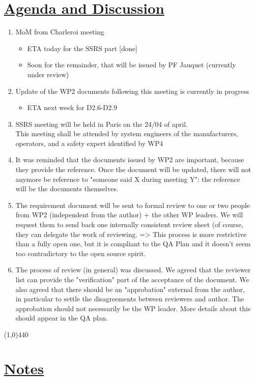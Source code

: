 \documentclass[a4paper]{article}
\begin{document}
\section*{\underline{Agenda and Discussion}}
\begin{enumerate}
\item MoM from Charleroi meeting 
\begin{itemize}
\item ETA today for the SSRS part [done]
\item Soon for the remainder, that will be issued by PF Jauquet (currently under review)
\end{itemize}
\item Update of the WP2 documents following this meeting is currently in progress
\begin{itemize}
\item ETA next week for D2.6-D2.9
\end{itemize}
\item SSRS meeting will be held in Paris on the 24/04 of april.\\
This meeting shall be attended by system engineers of the manufacturers, operators, and a safety expert identified by WP4\\
\item It was reminded that the documents issued by WP2 are important, because they provide the reference. Once the document will be updated, there will not anymore be reference to "someone said X during meeting Y": the reference will be the documents themselves.\\
\item The requirement document will be sent to formal review to one or two people from WP2 (independent from the author) + the other WP leaders. We will request them to send back one internally consistent review sheet  (of course, they can delegate the work of reviewing. => This process is more restrictive than a fully open one, but it is compliant to the QA Plan and it doesn't seem too contradictory to the open source spirit.
\item The process of review (in general) was discussed. We agreed that the reviewer list can provide the "verification" part of the acceptance of the document. We also agreed that there should be an "approbation" external from the author, in particular to settle the disagreements between reviewers and author. The approbation should not necessarily be the WP leader. More details about this should appear in the QA plan.

\end{enumerate}
\line(1,0){440}
\section*{\underline{Notes}}
\end{document}
